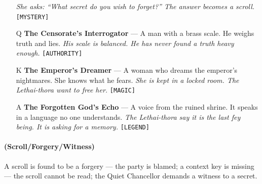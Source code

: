 \begin{enumerate}
  \hfill \textit{She asks: ``What secret do you wish to forget?'' The answer becomes a scroll.} \texttt{[MYSTERY]}
\item[Q] \textbf{The Censorate's Interrogator} --- A man with a brass scale. He weighs truth and lies.
  \hfill \textit{His scale is balanced. He has never found a truth heavy enough.} \texttt{[AUTHORITY]}
\item[K] \textbf{The Emperor's Dreamer} --- A woman who dreams the emperor's nightmares. She knows what he fears.
  \hfill \textit{She is kept in a locked room. The Lethai-thora want to free her.} \texttt{[MAGIC]}
\item[A] \textbf{The Forgotten God's Echo} --- A voice from the ruined shrine. It speaks in a language no one understands.
  \hfill \textit{The Lethai-thora say it is the last fey being. It is asking for a memory.} \texttt{[LEGEND]}
\end{enumerate}

\paragraph*{(Scroll/Forgery/Witness)} A scroll is found to be a forgery --- the party is blamed; a context key is missing --- the scroll cannot be read; the Quiet Chancellor demands a witness to a secret.

